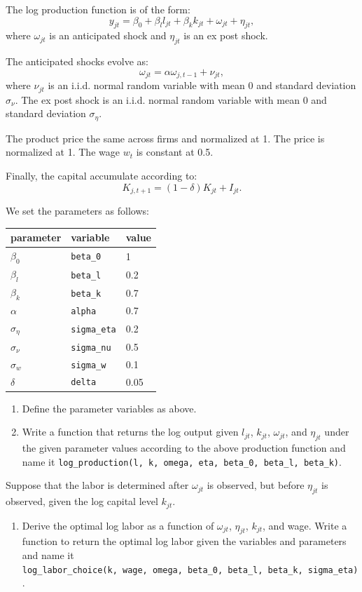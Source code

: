\documentclass[]{book}
\providecommand{\tightlist}{%
  \setlength{\itemsep}{0pt}\setlength{\parskip}{0pt}}
\begin{document}
The log production function is of the form: \[
y_{jt} = \beta_0 + \beta_l l_{jt} + \beta_k k_{jt} + \omega_{jt} + \eta_{jt},
\] where \(\omega_{jt}\) is an anticipated shock and \(\eta_{jt}\) is an
ex post shock.

The anticipated shocks evolve as: \[
\omega_{jt} = \alpha \omega_{j, t - 1} + \nu_{jt},
\] where \(\nu_{jt}\) is an i.i.d. normal random variable with mean 0
and standard deviation \(\sigma_\nu\). The ex post shock is an i.i.d.
normal random variable with mean 0 and standard deviation
\(\sigma_{\eta}\).

The product price the same across firms and normalized at 1. The price
is normalized at 1. The wage \(w_t\) is constant at 0.5.

Finally, the capital accumulate according to: \[
K_{j, t + 1} = (1 - \delta) K_{jt} + I_{jt}.
\]

We set the parameters as follows:

\begin{longtable}[]{@{}lll@{}}
\toprule
parameter & variable & value\tabularnewline
\midrule
\endhead
\(\beta_0\) & \texttt{beta\_0} & 1\tabularnewline
\(\beta_l\) & \texttt{beta\_l} & 0.2\tabularnewline
\(\beta_k\) & \texttt{beta\_k} & 0.7\tabularnewline
\(\alpha\) & \texttt{alpha} & 0.7\tabularnewline
\(\sigma_{\eta}\) & \texttt{sigma\_eta} & 0.2\tabularnewline
\(\sigma_{\nu}\) & \texttt{sigma\_nu} & 0.5\tabularnewline
\(\sigma_{w}\) & \texttt{sigma\_w} & 0.1\tabularnewline
\(\delta\) & \texttt{delta} & 0.05\tabularnewline
\bottomrule
\end{longtable}

\begin{enumerate}
\def\labelenumi{\arabic{enumi}.}
\item
  Define the parameter variables as above.
\item
  Write a function that returns the log output given \(l_{jt}\),
  \(k_{jt}\), \(\omega_{jt}\), and \(\eta_{jt}\) under the given
  parameter values according to the above production function and name
  it
  \texttt{log\_production(l,\ k,\ omega,\ eta,\ beta\_0,\ beta\_l,\ beta\_k)}.
\end{enumerate}

Suppose that the labor is determined after \(\omega_{jt}\) is observed,
but before \(\eta_{jt}\) is observed, given the log capital level
\(k_{jt}\).

\begin{enumerate}
\def\labelenumi{\arabic{enumi}.}
\setcounter{enumi}{2}
\tightlist
\item
  Derive the optimal log labor as a function of \(\omega_{jt}\),
  \(\eta_{jt}\), \(k_{jt}\), and wage. Write a function to return the
  optimal log labor given the variables and parameters and name it
  \texttt{log\_labor\_choice(k,\ wage,\ omega,\ beta\_0,\ beta\_l,\ beta\_k,\ sigma\_eta)}.
\end{enumerate}
\end{document}
